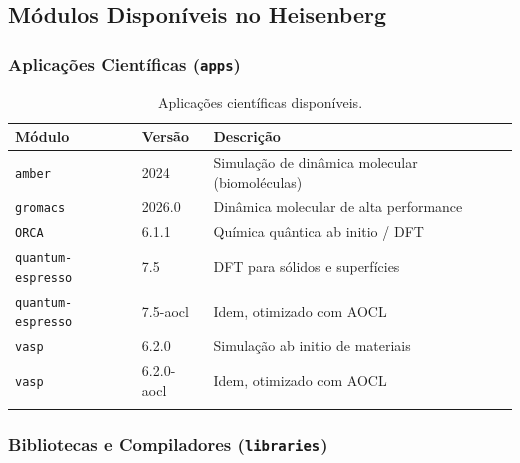 \documentclass[11pt, a4paper]{article}
\begin{document}
\subsection{Módulos Disponíveis no Heisenberg}

\subsubsection{Aplicações Científicas (\texttt{apps})}

\begin{longtable}{lll}
  \toprule
  \textbf{Módulo} & \textbf{Versão} & \textbf{Descrição} \\
  \midrule
  \endhead
  \texttt{amber} & 2024 & Simulação de dinâmica molecular (biomoléculas) \\
  \texttt{gromacs} & 2026.0 & Dinâmica molecular de alta performance \\
  \texttt{ORCA} & 6.1.1 & Química quântica ab initio / DFT \\
  \texttt{quantum-espresso} & 7.5 & DFT para sólidos e superfícies \\
  \texttt{quantum-espresso} & 7.5-aocl & Idem, otimizado com AOCL \\
  \texttt{vasp} & 6.2.0 & Simulação ab initio de materiais \\
  \texttt{vasp} & 6.2.0-aocl & Idem, otimizado com AOCL \\
  \bottomrule
  \caption{Aplicações científicas disponíveis.}
\end{longtable}

\subsubsection{Bibliotecas e Compiladores (\texttt{libraries})}
\end{document}
